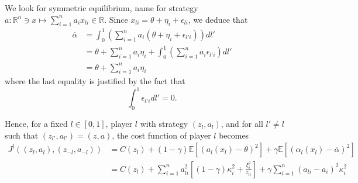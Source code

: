 We look for symmetric equilibrium, name for strategy $a: \mathbb{R}^n \ni x \mapsto \sum_{i=1}^n a_i x_{li} \in \mathbb{R}$. Since $x_{li} = \theta + \eta_i + \epsilon_{li}$, we deduce that
\begin{align*}
	\overline{\alpha} &= \int_0^1 \left( \sum_{i=1}^n a_i (\theta + \eta_i + \epsilon_{l'i} ) \right) dl' \\
	&= \theta + \sum_{i=1}^n a_i \eta_i + \int_0^1 \left(\sum_{i=1}^n a_i \epsilon_{l'i} \right) dl' \\
	&= \theta + \sum_{i=1}^n a_i \eta_i
\end{align*}
where the last equality is justified by the fact that 
$$
	\int_{0}^1 \epsilon_{l'i} dl' = 0.
$$

Hence, for a fixed $l \in [0,1]$, player $l$ with strategy $(z_l,a_l)$, and for all $l' \neq l$ such that $(z_{l'}, a_{l'}) = (z, a)$, the cost function of player $l$ becomes 
\begin{align*}
	J^l( (z_l, a_l), (z_{-l}, a_{-l}) ) &= C(z_l) + (1-\gamma) \mathbb{E}[ (a_l(x_l) - \theta)^2 ] + \gamma \mathbb{E}[ (\alpha_l(x_l) - \overline{\alpha})^2 ] \\
	&= C(z_l) + \sum_{i=1}^n a_{li}^2 \left[ (1-\gamma) \kappa_i^2 + \frac{\xi_i^2}{z_{li} } \right] + \gamma \sum_{i=1}^n (a_{li} - a_i)^2 \kappa_i^2
\end{align*}
